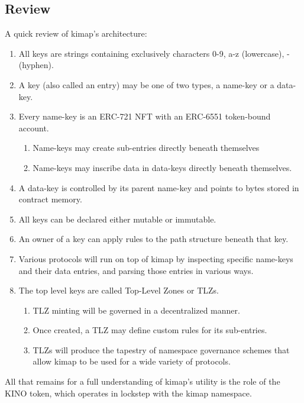 \documentclass[runningheads]{llncs}
\begin{document}
\subsection{Review}
\label{sec:kimapreview}

A quick review of kimap's architecture:

\begin{enumerate}
    \item All keys are strings containing exclusively characters 0-9, a-z (lowercase), - (hyphen).
    \item A key (also called an entry) may be one of two types, a name-key or a data-key.
    \item Every name-key is an ERC-721 NFT with an ERC-6551 token-bound account.
        \begin{enumerate}
            \item Name-keys may create sub-entries directly beneath themselves
            \item Name-keys may inscribe data in data-keys directly beneath themselves.
        \end{enumerate}
    \item A data-key is controlled by its parent name-key and points to bytes stored in contract memory.
    \item All keys can be declared either mutable or immutable.
    \item An owner of a key can apply rules to the path structure beneath that key.
    \item Various protocols will run on top of kimap by inspecting specific name-keys and their data entries, and parsing those entries in various ways.
    \item The top level keys are called Top-Level Zones or TLZs.
        \begin{enumerate}
            \item TLZ minting will be governed in a decentralized manner.
            \item Once created, a TLZ may define custom rules for its sub-entries.
            \item TLZs will produce the tapestry of namespace governance schemes that allow kimap to be used for a wide variety of protocols.
        \end{enumerate}
\end{enumerate}

All that remains for a full understanding of kimap's utility is the role of the KINO token, which operates in lockstep with the kimap namespace.
\end{document}
